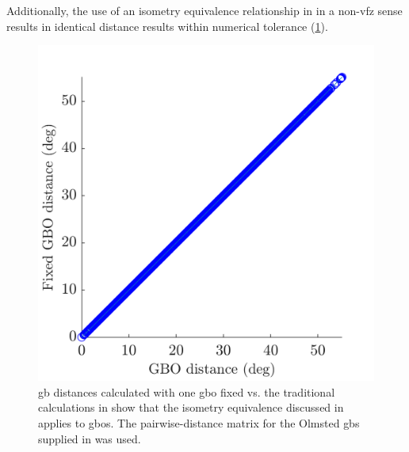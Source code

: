 \documentclass[preprint,12pt]{elsarticle}
\begin{document}
Additionally, the use of an isometry equivalence relationship in \citet{morawiecDistancesGrainInterfaces2019} in a non-\gls{vfz} sense results in identical distance results within numerical tolerance (\cref{fig:pd-fix}).

\begin{figure}
    \centering
    \includegraphics{figures/pd-fix.png}
    \caption{\Gls{gb} distances calculated with one \gls{gbo} fixed vs. the traditional calculations in \citet{chesserLearningGrainBoundary2020} show that the isometry equivalence discussed in \citet{morawiecDistancesGrainInterfaces2019} applies to \glspl{gbo}. The pairwise-distance matrix for the Olmsted \glspl{gb} supplied in \cite{chesserGBOctonionCode2019} was used. }
    \label{fig:pd-fix}
\end{figure}
\end{document}
